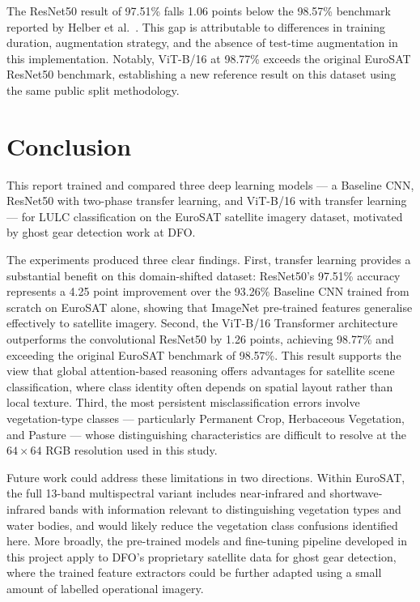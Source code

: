\documentclass[12pt, letterpaper]{article}
\begin{document}
The ResNet50 result of 97.51\% falls 1.06 points below the 98.57\% benchmark reported
by Helber et al.\ \cite{helber2019eurosat}. This gap is attributable to differences
in training duration, augmentation strategy, and the absence of test-time augmentation
in this implementation. Notably, ViT-B/16 at 98.77\% exceeds the original EuroSAT
ResNet50 benchmark, establishing a new reference result on this dataset using the same
public split methodology.

\section*{Conclusion}

This report trained and compared three deep learning models --- a Baseline CNN,
ResNet50 with two-phase transfer learning, and ViT-B/16 with transfer learning ---
for LULC classification on the EuroSAT satellite imagery dataset, motivated by
ghost gear detection work at DFO.

The experiments produced three clear findings. First, transfer learning provides a
substantial benefit on this domain-shifted dataset: ResNet50's 97.51\% accuracy
represents a 4.25 point improvement over the 93.26\% Baseline CNN trained from
scratch on EuroSAT alone, showing that ImageNet pre-trained features generalise
effectively to satellite imagery. Second, the ViT-B/16 Transformer architecture
outperforms the convolutional ResNet50 by 1.26 points, achieving 98.77\% and
exceeding the original EuroSAT benchmark of 98.57\%. This result supports the view
that global attention-based reasoning offers advantages for satellite scene
classification, where class identity often depends on spatial layout rather than
local texture. Third, the most persistent misclassification errors involve
vegetation-type classes --- particularly Permanent Crop, Herbaceous Vegetation, and
Pasture --- whose distinguishing characteristics are difficult to resolve at the
$64 \times 64$ RGB resolution used in this study.

Future work could address these limitations in two directions. Within EuroSAT, the
full 13-band multispectral variant includes near-infrared and shortwave-infrared
bands with information relevant to distinguishing vegetation types
and water bodies, and would likely reduce the vegetation class confusions identified
here. More broadly, the pre-trained models and fine-tuning pipeline developed in
this project apply to DFO's proprietary satellite data for ghost
gear detection, where the trained feature extractors could be further adapted using
a small amount of labelled operational imagery.
\end{document}
